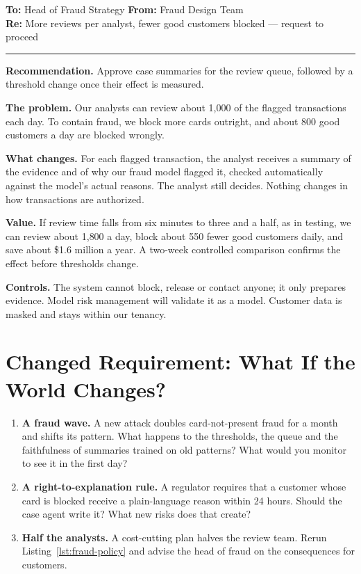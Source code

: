 \begin{tcolorbox}[colback=white, colframe=black!60, boxrule=0.6pt, arc=1pt, left=10pt, right=10pt, top=8pt, bottom=8pt, fontupper=\small]
\textbf{To:} Head of Fraud Strategy \hfill \textbf{From:} Fraud Design Team\\
\textbf{Re:} More reviews per analyst, fewer good customers blocked --- request to proceed

\smallskip\hrule\smallskip

\textbf{Recommendation.} Approve case summaries for the review queue, followed by a threshold change once their effect is measured.

\textbf{The problem.} Our analysts can review about 1{,}000 of the flagged transactions each day. To contain fraud, we block more cards outright, and about 800 good customers a day are blocked wrongly.

\textbf{What changes.} For each flagged transaction, the analyst receives a summary of the evidence and of why our fraud model flagged it, checked automatically against the model's actual reasons. The analyst still decides. Nothing changes in how transactions are authorized.

\textbf{Value.} If review time falls from six minutes to three and a half, as in testing, we can review about 1{,}800 a day, block about 550 fewer good customers daily, and save about \$1.6 million a year. A two-week controlled comparison confirms the effect before thresholds change.

\textbf{Controls.} The system cannot block, release or contact anyone; it only prepares evidence. Model risk management will validate it as a model. Customer data is masked and stays within our tenancy.
\end{tcolorbox}

\section{Changed Requirement: What If the World Changes?}
\label{sec:fr-changed}

\begin{enumerate}[itemsep=3pt]
  \item \textbf{A fraud wave.} A new attack doubles card-not-present fraud for a month and shifts its pattern. What happens to the thresholds, the queue and the faithfulness of summaries trained on old patterns? What would you monitor to see it in the first day?
  \item \textbf{A right-to-explanation rule.} A regulator requires that a customer whose card is blocked receive a plain-language reason within 24 hours. Should the case agent write it? What new risks does that create?
  \item \textbf{Half the analysts.} A cost-cutting plan halves the review team. Rerun Listing~\ref{lst:fraud-policy} and advise the head of fraud on the consequences for customers.
\end{enumerate}

